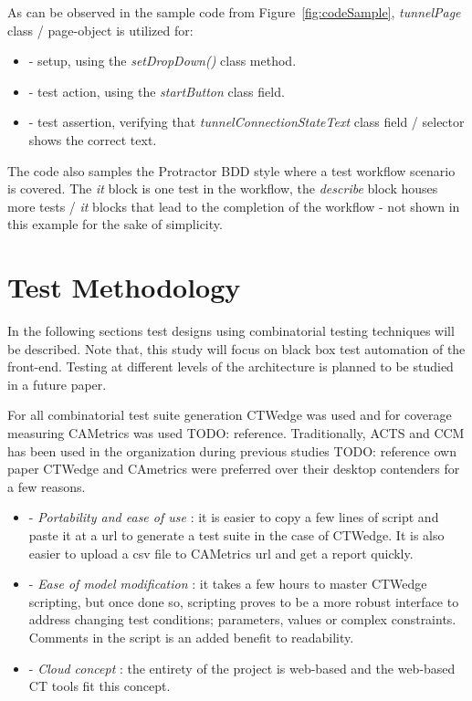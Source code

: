 \documentclass[conference]{IEEEtran}
\newcommand{\todo}[1]{}
\renewcommand{\todo}[1]{{\color{red} TODO: {#1}}}
\begin{document}
	As can be observed in the sample code from Figure~\ref{fig:codeSample}, \textit{tunnelPage} class / page-object is utilized for:
	
	\begin{itemize}
		\item [] - setup, using the \textit{setDropDown()} class method. 
		\item [] - test action, using the \textit{startButton} class field.
		\item [] - test assertion, verifying that \textit{tunnelConnectionStateText} class field / selector shows the correct text.
	\end{itemize}

	The code also samples the Protractor BDD style where a test workflow scenario is covered. 
	The \textit{it} block is one test in the workflow, the \textit{describe} block houses more tests / \textit{it} blocks that lead to the completion of the workflow - not shown in this example for the sake of simplicity.
	
\section{Test Methodology}
	
	In the following sections test designs using combinatorial testing techniques will be described. 
	Note that, this study will focus on black box test automation of the front-end. Testing at different levels of the architecture is planned to be studied in a future paper.

	For all combinatorial test suite generation CTWedge was used and for coverage measuring CAMetrics was used \todo{reference}.
	Traditionally, ACTS and CCM has been used in the organization during previous studies \todo{reference own paper}
	CTWedge and CAmetrics were preferred over their desktop contenders for a few reasons.

	\begin{itemize}
		\item [] - \textit{Portability and ease of use} : it is easier to copy a few lines of script and paste it at a url to generate a test suite in the case of CTWedge. It is also easier to upload a csv file to CAMetrics url and get a report quickly.
		\item [] - \textit{Ease of model modification} : it takes a few hours to master CTWedge scripting, but once done so, scripting proves to be a more robust interface to address changing test conditions; parameters, values or complex constraints. Comments in the script is an added benefit to readability. 
		\item [] - \textit{Cloud concept} : the entirety of the project is web-based and the web-based CT tools fit this concept.
	\end{itemize}
	
\end{document}
